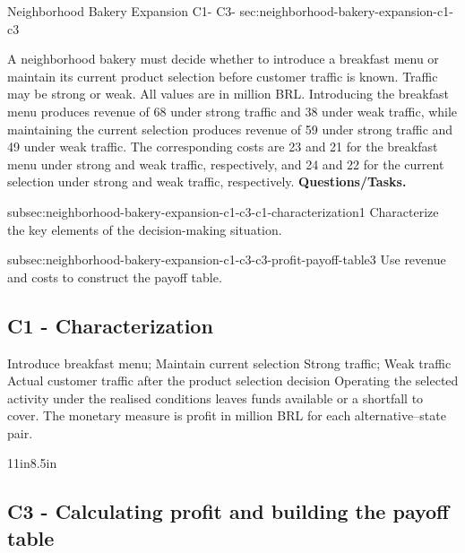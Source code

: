 	\sectionScored
	{Neighborhood Bakery Expansion}
	{C1- \hspace{2mm} C3-}
	{sec:neighborhood-bakery-expansion-c1-c3}
	{
		A neighborhood bakery must decide whether to introduce a breakfast menu or maintain its current product selection before customer traffic is known. Traffic may be strong or weak. All values are in million BRL. Introducing the breakfast menu produces revenue of 68 under strong traffic and 38 under weak traffic, while maintaining the current selection produces revenue of 59 under strong traffic and 49 under weak traffic. The corresponding costs are 23 and 21 for the breakfast menu under strong and weak traffic, respectively, and 24 and 22 for the current selection under strong and weak traffic, respectively.
			\textbf{Questions/Tasks.}
		\begin{enumerate}
			\CriterionTask
			{subsec:neighborhood-bakery-expansion-c1-c3-c1-characterization}{1}
			{Characterize the key elements of the decision-making situation. }
			
			\CriterionTask
			{subsec:neighborhood-bakery-expansion-c1-c3-c3-profit-payoff-table}{3}
			{Use revenue and costs to construct the payoff table. }
		\end{enumerate}
		
		\label{subsec:neighborhood-bakery-expansion-c1-c3-c1-characterization}
		\subsection*{C1 - Characterization }
		
		\DecisionElementsTable
{Introduce breakfast menu; Maintain current selection}
{Strong traffic; Weak traffic}
{Actual customer traffic after the product selection decision}
{Operating the selected activity under the realised conditions leaves funds available or a shortfall to cover. The monetary measure is profit in million BRL for each alternative--state pair.}

		
		\begin{CalculationLandscape}{11in}{8.5in}
		\label{subsec:neighborhood-bakery-expansion-c1-c3-c3-profit-payoff-table}
		\subsection*{C3 - Calculating profit and building the payoff table }
		

\end{CalculationLandscape}}
